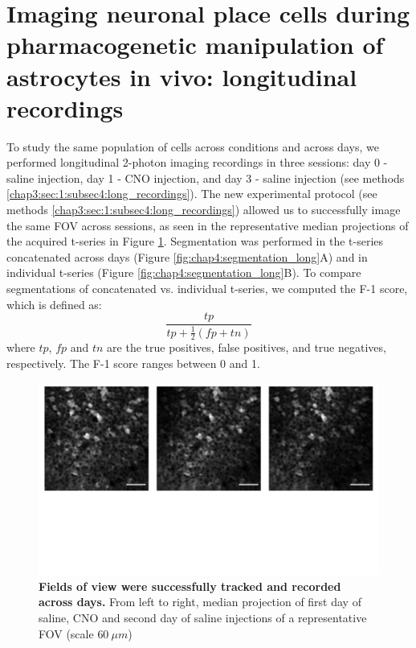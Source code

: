 \section{Imaging neuronal place cells during pharmacogenetic manipulation of astrocytes in vivo: longitudinal recordings}
\label{chap4:sec:4:longitudinal_recordings}
To study the same population of cells across conditions and across days, we performed longitudinal 2-photon imaging recordings in three sessions: day 0 - saline injection, day 1 - CNO injection, and day 3 - saline injection (see methods \ref{chap3:sec:1:subsec4:long_recordings}).
The new experimental protocol (see methods \ref{chap3:sec:1:subsec4:long_recordings}) allowed us to successfully image the same FOV across sessions, as seen in the representative median projections of the acquired t-series in Figure \ref{fig:chap4:example_longitudinal_FOV}.
Segmentation was performed in the t-series concatenated across days (Figure \ref{fig:chap4:segmentation_long}A) and in individual t-series (Figure \ref{fig:chap4:segmentation_long}B).
To compare segmentations of concatenated vs. individual t-series, we computed the F-1 score, which is defined as: 
\begin{equation*}
    \frac{tp}{tp+\frac{1}{2}(fp+tn)}
\end{equation*}
where $tp$, $fp$ and $tn$ are the true positives, false positives, and true negatives, respectively. The F-1 score ranges between 0 and 1.
\begin{figure}[h]
    \centering
    \includegraphics[trim={0 240 0 0},clip,width=\textwidth]{Figures/Chapter4/example_longitudinal_FOV.pdf}
    \caption[Fields of view were successfully tracked and recorded across days]{\textbf{Fields of view were successfully tracked and recorded across days.}
    From left to right, median projection of first day of saline, CNO and second day of saline injections of a representative FOV (scale $60\ \mu m$)}
    \label{fig:chap4:example_longitudinal_FOV}
\end{figure}
